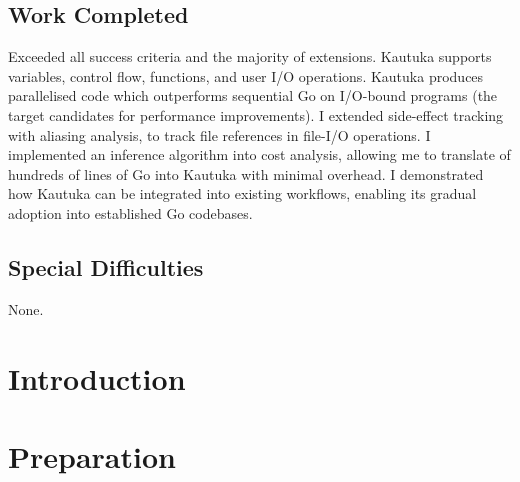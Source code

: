 \documentclass[12pt,a4paper,twoside,openright]{report}
\begin{document}
\section*{Work Completed}

Exceeded all success criteria and the majority of extensions. Kautuka supports variables, control flow, functions, and user I/O operations. Kautuka produces parallelised code which outperforms sequential Go on I/O-bound programs (the target candidates for performance improvements). I extended side-effect tracking with aliasing analysis, to track file references in file-I/O operations. I implemented an inference algorithm into cost analysis, allowing me to translate of hundreds of lines of Go into Kautuka with minimal overhead. I demonstrated how Kautuka can be integrated into existing workflows, enabling its gradual adoption into established Go codebases.

\section*{Special Difficulties}

None.

\tableofcontents


\newpage
{}
\setcounter{page}{1}








\chapter{Introduction}


\chapter{Preparation}

\end{document}
